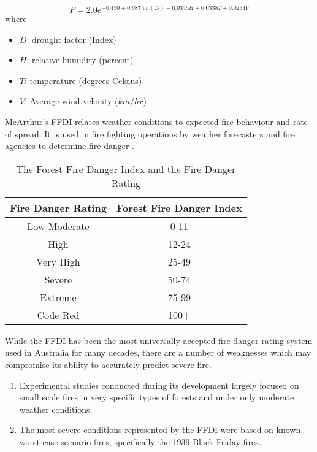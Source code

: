 \documentclass{article}
\begin{document}
\begin{equation}
\label{eq FFDI}
F=2.0 e^{-0.450 + 0.987 \ln(D)-0.0345H+0.0338T+0.0234V}
\end{equation}
where 
\begin{itemize}
	\item $D$: drought factor (Index)
	\item $H$: relative humidity (percent)
	\item $T$: temperature (degrees Celsius)
	\item $V$: Average wind velocity ($km/hr$)
\end{itemize}

McArthur's FFDI relates weather conditions to expected fire behaviour and rate of spread. It is used in fire fighting operations by weather forecasters and fire agencies to determine fire danger \citep{clarke2013}. 

\begin{table}[ht]
	\centering
	\begin{tabular}{|c|c|}
		\hline Fire Danger Rating & Forest Fire Danger Index \\ 
		\hline
		Low-Moderate  & 0-11 \\ 
		High  &  12-24 \\ 
		Very High  &  25-49\\ 
		Severe &  50-74\\ 
		Extreme  &  75-99 \\ 
		Code Red  &  100+ \\ 
		\hline 
	\end{tabular}
	\caption{The Forest Fire Danger Index and the Fire Danger Rating}
	\label{table:FDR}
\end{table}

While the FFDI has been the most universally accepted fire danger rating system used in Australia for many decades, there are a number of weaknesses which may compromise its ability to accurately predict severe fire. 

\begin{enumerate}
	\item Experimental studies conducted during its development largely focused on small scale fires in very specific types of forests and under only moderate weather conditions. 
	\item The most severe conditions represented by the FFDI were based on known worst case scenario fires, specifically the 1939 Black Friday fires.
\end{enumerate}
\end{document}
